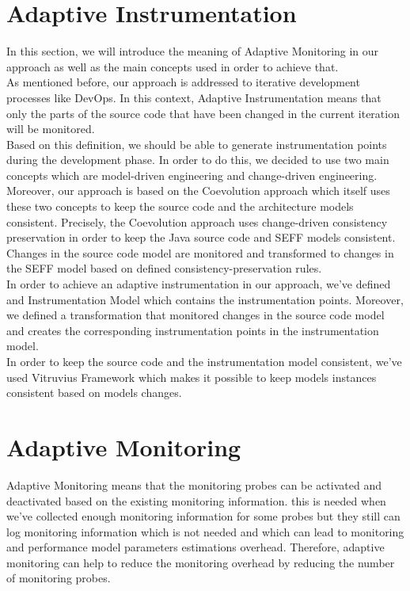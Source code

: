 \section{Adaptive Instrumentation}
\label{sec:Adaptive Instrumentation}
In this section, we will introduce the meaning of Adaptive Monitoring in our approach as well as the main concepts used in order to achieve that.\\

As mentioned before, our approach is addressed to iterative development processes like DevOps. In this context, Adaptive Instrumentation means that only the parts of the source code that have been changed in the current iteration will be monitored. \\

Based on this definition, we should be able to generate instrumentation points during the development phase. In order to do this, we decided to use two main concepts which are model-driven engineering and change-driven engineering. Moreover, our approach is based on the Coevolution approach which itself uses these two concepts to keep the source code and the architecture models consistent. Precisely, the Coevolution approach uses change-driven consistency preservation in order to keep the Java source code and SEFF models consistent. Changes in the source code model are monitored and transformed to changes in the SEFF model based on defined consistency-preservation rules. \\

In order to achieve an adaptive instrumentation in our approach, we’ve defined and Instrumentation Model which contains the instrumentation points. Moreover, we defined a transformation that monitored changes in the source code model and creates the corresponding instrumentation points in the instrumentation model. \\

In order to keep the source code and the instrumentation model consistent, we've used Vitruvius Framework which makes it possible to keep models instances consistent based on models changes. 

\section{Adaptive Monitoring}
\label{sec:Adaptive Monitoring}
Adaptive Monitoring means that the monitoring probes can be activated and deactivated based on the existing monitoring information. this is needed when we’ve collected enough monitoring information for some probes but they still can log monitoring information which is not needed and which can lead to monitoring and performance model parameters estimations overhead.  Therefore, adaptive monitoring can help to reduce the monitoring overhead by reducing the number of monitoring probes. \\

